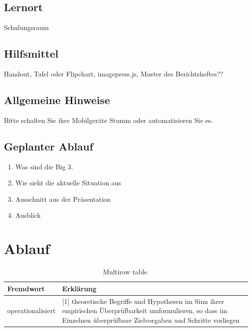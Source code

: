 \documentclass[a4paper, 12pt]{article}
\begin{document}
   \subsection{Lernort}
   Schulungsraum
   
   \subsection{Hilfsmittel}
   Handout, Tafel oder Flipchart, imagepress.js, Muster des Berichtsheftes??
   
	\subsection{Allgemeine Hinweise}
	Bitte schalten Sie ihre Mobilgeräte Stumm oder automatisieren Sie es.
	
	\subsection{Geplanter Ablauf}
	\begin{enumerate}
		\item Was sind die Big 3. %
		\item Wie sieht die aktuelle Situation aus
		\item Ausschnitt aus der Präsentation %
		\item Ausblick
	\end{enumerate}
\newpage
\section{Ablauf}
\begin{table}[h!]
	\begin{center}
		\caption{Multirow table.}
		\label{tab:table1}
		\begin{tabular}{|l|p{10cm}|}
			\textbf{Fremdwort} & \textbf{Erklärung}\\
			\hline
			operationalisiert &[1] theoretische Begriffe und Hypothesen im Sinn ihrer empirischen Überprüfbarkeit umformulieren, so dass im Einzelnen überprüfbare Zielvorgaben und Schritte vorliegen\\
		\end{tabular}
	\end{center}
\end{table}

        
\newpage        
\end{document}
